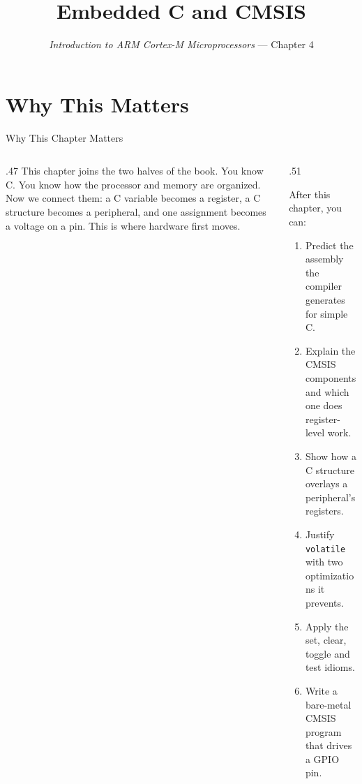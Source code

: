 \documentclass[9pt,aspectratio=169,xcolor=table]{beamer}
\title{Embedded C and CMSIS}
\subtitle{\emph{Introduction to ARM Cortex-M Microprocessors} --- Chapter 4}
\begin{document}
\titlepage

\section{Why This Matters}

\begin{frame}{Why This Chapter Matters}
    \begin{columns}[T]
    \begin{column}{.47\textwidth}
        {\normalsize This chapter joins the two halves of the book. You know C. You know how the processor and memory are organized. Now we connect them: a C variable becomes a register, a C structure becomes a peripheral, and one assignment becomes a voltage on a pin. This is where hardware first moves.}
    \end{column}
    \begin{column}{.51\textwidth}
        \begin{block}{After this chapter, you can:}
        {\small
        \begin{enumerate}\itemsep2pt
            \item Predict the assembly the compiler generates for simple C.
            \item Explain the CMSIS components and which one does register-level work.
            \item Show how a C structure overlays a peripheral's registers.
            \item Justify \texttt{volatile} with two optimizations it prevents.
            \item Apply the set, clear, toggle and test idioms.
            \item Write a bare-metal CMSIS program that drives a GPIO pin.
        \end{enumerate}}
        \end{block}
    \end{column}
    \end{columns}
\end{frame}
\end{document}
